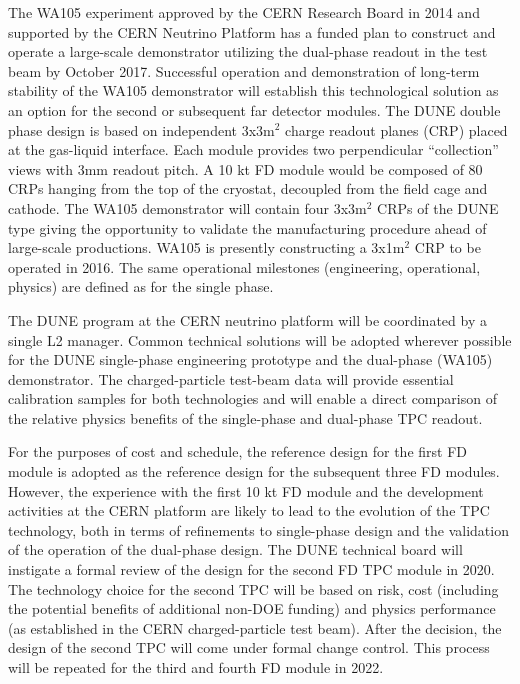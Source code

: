 The WA105 experiment approved by the CERN Research Board in 2014 and supported 
by the CERN Neutrino Platform has a funded plan to construct and operate a large-scale 
demonstrator utilizing the dual-phase readout in the test beam by October 2017. 
Successful operation and demonstration of long-term stability of the WA105 demonstrator 
will establish this technological solution as an option for the second or subsequent 
far detector modules. The DUNE double phase design is based on independent 3x3m$^2$
charge readout planes (CRP) placed at the gas-liquid interface. Each module provides 
two perpendicular ``collection'' views with 3mm readout pitch. A 10 kt FD module 
would be composed of 80 CRPs hanging from the top of the cryostat, decoupled from 
the field cage and cathode. The WA105 demonstrator will contain four 3x3m$^2$ 
CRPs of the DUNE type giving the opportunity to validate the manufacturing procedure 
ahead of large-scale productions. WA105 is presently constructing a 3x1m$^2$ 
CRP to be operated in 2016. The same operational milestones (engineering, operational, 
physics) are defined as for the single phase.

The DUNE program at the CERN neutrino platform will be coordinated by a single 
L2 manager. Common technical solutions will be adopted wherever possible for the 
DUNE single-phase engineering prototype and the dual-phase (WA105) demonstrator. 
The charged-particle test-beam data will provide essential calibration samples 
for both technologies and will enable a direct comparison of the relative physics 
benefits of the single-phase and dual-phase TPC readout. 


For the purposes of cost and schedule, the reference design for the first FD module 
is adopted as the reference design for the subsequent three FD modules. However, 
the experience with the first 10 kt FD module and the development activities at 
the CERN platform are likely to lead to the evolution of the TPC technology, both 
in terms of refinements to single-phase design and the validation of the operation 
of the dual-phase design. The DUNE technical board will instigate a formal review 
of the design for the second FD TPC module in 2020. The technology choice for the 
second TPC will be based on risk, cost (including the potential benefits of additional 
non-DOE funding) and physics performance (as established in the CERN charged-particle 
test beam). After the decision, the design of the second TPC will come under formal 
change control. This process will be repeated for the third and fourth FD module 
in 2022.

